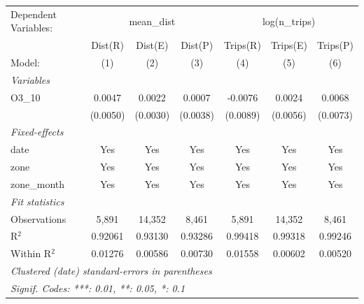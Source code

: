 \begingroup
\centering
\begin{tabular}{lcccccc}
   \tabularnewline \midrule \midrule
   Dependent Variables: & \multicolumn{3}{c}{mean\_dist} & \multicolumn{3}{c}{log(n\_trips)}\\
                & Dist(R)  & Dist(E)  & Dist(P)  & Trips(R) & Trips(E) & Trips(P) \\   
   Model:       & (1)      & (2)      & (3)      & (4)      & (5)      & (6)\\  
   \midrule
   \emph{Variables}\\
   O3\_10       & 0.0047   & 0.0022   & 0.0007   & -0.0076  & 0.0024   & 0.0068\\   
                & (0.0050) & (0.0030) & (0.0038) & (0.0089) & (0.0056) & (0.0073)\\   
   \midrule
   \emph{Fixed-effects}\\
   date         & Yes      & Yes      & Yes      & Yes      & Yes      & Yes\\  
   zone         & Yes      & Yes      & Yes      & Yes      & Yes      & Yes\\  
   zone\_month  & Yes      & Yes      & Yes      & Yes      & Yes      & Yes\\  
   \midrule
   \emph{Fit statistics}\\
   Observations & 5,891    & 14,352   & 8,461    & 5,891    & 14,352   & 8,461\\  
   R$^2$        & 0.92061  & 0.93130  & 0.93286  & 0.99418  & 0.99318  & 0.99246\\  
   Within R$^2$ & 0.01276  & 0.00586  & 0.00730  & 0.01558  & 0.00602  & 0.00520\\  
   \midrule \midrule
   \multicolumn{7}{l}{\emph{Clustered (date) standard-errors in parentheses}}\\
   \multicolumn{7}{l}{\emph{Signif. Codes: ***: 0.01, **: 0.05, *: 0.1}}\\
\end{tabular}
\par\endgroup
